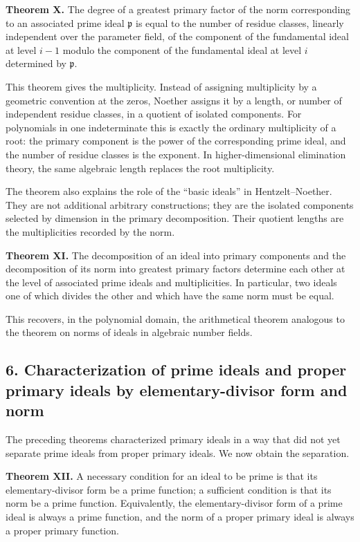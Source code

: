 \documentclass[11pt]{article}
\begin{document}
\textbf{Theorem X.} The degree of a greatest primary factor of the norm corresponding to an associated prime ideal $\mathfrak p$ is equal to the number of residue classes, linearly independent over the parameter field, of the component of the fundamental ideal at level $i-1$ modulo the component of the fundamental ideal at level $i$ determined by $\mathfrak p$.

This theorem gives the multiplicity. Instead of assigning multiplicity by a geometric convention at the zeros, Noether assigns it by a length, or number of independent residue classes, in a quotient of isolated components. For polynomials in one indeterminate this is exactly the ordinary multiplicity of a root: the primary component is the power of the corresponding prime ideal, and the number of residue classes is the exponent. In higher-dimensional elimination theory, the same algebraic length replaces the root multiplicity.

The theorem also explains the role of the ``basic ideals'' in Hentzelt--Noether. They are not additional arbitrary constructions; they are the isolated components selected by dimension in the primary decomposition. Their quotient lengths are the multiplicities recorded by the norm.

\textbf{Theorem XI.} The decomposition of an ideal into primary components and the decomposition of its norm into greatest primary factors determine each other at the level of associated prime ideals and multiplicities. In particular, two ideals one of which divides the other and which have the same norm must be equal.

This recovers, in the polynomial domain, the arithmetical theorem analogous to the theorem on norms of ideals in algebraic number fields.

\subsection{6. Characterization of prime ideals and proper primary ideals by elementary-divisor form and norm}

The preceding theorems characterized primary ideals in a way that did not yet separate prime ideals from proper primary ideals. We now obtain the separation.

\textbf{Theorem XII.} A necessary condition for an ideal to be prime is that its elementary-divisor form be a prime function; a sufficient condition is that its norm be a prime function. Equivalently, the elementary-divisor form of a prime ideal is always a prime function, and the norm of a proper primary ideal is always a proper primary function.
\end{document}
